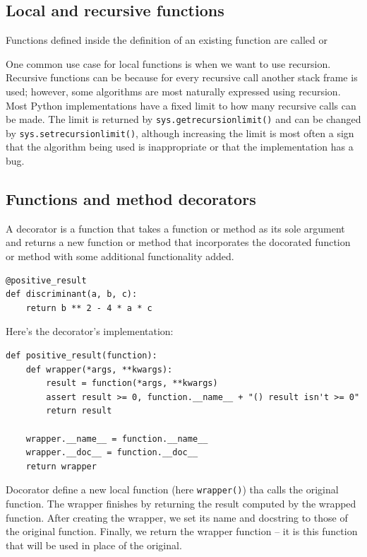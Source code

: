 \subsection{Local and recursive functions}

Functions defined inside the definition of an existing function are called  or 


One common use case for local functions is when we want to use recursion.
Recursive functions can be 
because for every recursive call another stack frame is used;
however, some algorithms are most naturally expressed using recursion.
Most Python implementations have a fixed limit to how many recursive calls can be made.
The limit is returned by \verb|sys.getrecursionlimit()| and can be changed by \verb|sys.setrecursionlimit()|,
although increasing the limit is most often a sign that the algorithm being used is inappropriate or that
the implementation has a bug.


\subsection{Functions and method decorators}

\begin{tcolorbox}
  A decorator is a function that takes a function or method as its sole argument and
  returns a new function or method that incorporates the docorated function or method
  with some additional functionality added.
\end{tcolorbox}


\begin{lstlisting}
@positive_result
def discriminant(a, b, c):
    return b ** 2 - 4 * a * c
\end{lstlisting}


Here's the decorator's implementation:
\begin{lstlisting}
def positive_result(function):
    def wrapper(*args, **kwargs):
        result = function(*args, **kwargs)
        assert result >= 0, function.__name__ + "() result isn't >= 0"
        return result

    wrapper.__name__ = function.__name__
    wrapper.__doc__ = function.__doc__
    return wrapper
\end{lstlisting}


Docorator define a new local function (here \verb|wrapper()|) tha calls the original function.
The wrapper finishes by returning the result computed by the wrapped function.
After creating the wrapper, we set its name and docstring to those of the original function.
Finally, we return the wrapper function -- it is this function that will be used in place of the original.




